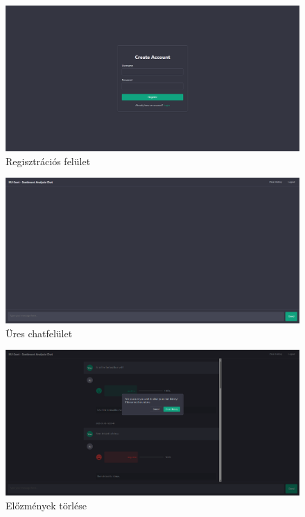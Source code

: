 \documentclass[12pt]{article}
\begin{document}
\begin{figure}[H]
    \centering
    \includegraphics[width=\linewidth]{images/02_register.png}
    \caption{Regisztrációs felület}
    \label{fig:02_register}
\end{figure}

\begin{figure}[H]
    \centering
    \includegraphics[width=\linewidth]{images/03_chat.png}
    \caption{Üres chatfelület}
    \label{fig:03_chat}
\end{figure}

\begin{figure}[H]
    \centering
    \includegraphics[width=\linewidth]{images/05_history.png}
    \caption{Előzmények törlése}
    \label{fig:05_history}
\end{figure}
\end{document}
